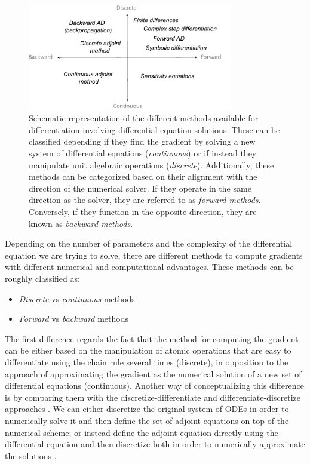 \begin{figure}[t]
    \centering
    \includegraphics[width=0.80\textwidth]{figures/scheme-methods.pdf}
    \caption{Schematic representation of the different methods available for differentiation involving differential equation solutions. These can be classified depending if they find the gradient by solving a new system of differential equations (\textit{continuous}) or if instead they manipulate unit algebraic operations (\textit{discrete}). Additionally, these methods can be categorized based on their alignment with the direction of the numerical solver. If they operate in the same direction as the solver, they are referred to as \textit{forward methods}. Conversely, if they function in the opposite direction, they are known as \textit{backward methods}.}
    \label{fig:diff}
\end{figure}
Depending on the number of parameters and the complexity of the differential equation we are trying to solve, there are different methods to compute gradients with different numerical and computational advantages.
These methods can be roughly classified as:
\begin{itemize}
    \item \textit{Discrete} vs \textit{continuous} methods
    \item \textit{Forward} vs \textit{backward} methods
\end{itemize}
The first difference regards the fact that the method for computing the gradient can be either based on the manipulation of atomic operations that are easy to differentiate using the chain rule several times (discrete), in opposition to the approach of approximating the gradient as the numerical solution of a new set of differential equations (continuous).
Another way of conceptualizing this difference is by comparing them with the discretize-differentiate and differentiate-discretize approaches \cite{bradley2013pde, Onken_Ruthotto_2020, FATODE2014, Sirkes_Tziperman_1997}.   
We can either discretize the original system of ODEs in order to numerically solve it and then define the set of adjoint equations on top of the numerical scheme; or instead define the adjoint equation directly using the differential equation and then discretize both in order to numerically approximate the solutions \cite{Giles_Pierce_2000}.

